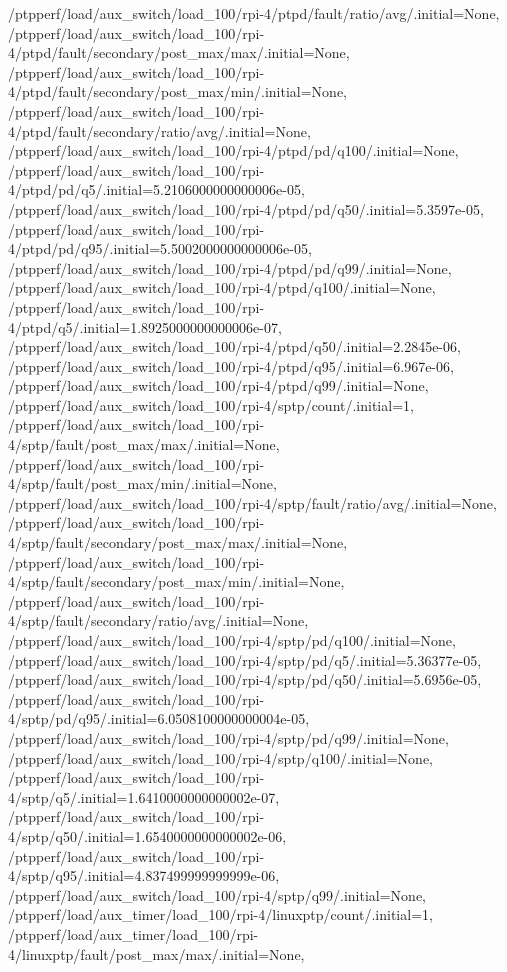 {    /ptpperf/load/aux_switch/load_100/rpi-4/ptpd/fault/ratio/avg/.initial=None,
    /ptpperf/load/aux_switch/load_100/rpi-4/ptpd/fault/secondary/post_max/max/.initial=None,
    /ptpperf/load/aux_switch/load_100/rpi-4/ptpd/fault/secondary/post_max/min/.initial=None,
    /ptpperf/load/aux_switch/load_100/rpi-4/ptpd/fault/secondary/ratio/avg/.initial=None,
    /ptpperf/load/aux_switch/load_100/rpi-4/ptpd/pd/q100/.initial=None,
    /ptpperf/load/aux_switch/load_100/rpi-4/ptpd/pd/q5/.initial=5.2106000000000006e-05,
    /ptpperf/load/aux_switch/load_100/rpi-4/ptpd/pd/q50/.initial=5.3597e-05,
    /ptpperf/load/aux_switch/load_100/rpi-4/ptpd/pd/q95/.initial=5.5002000000000006e-05,
    /ptpperf/load/aux_switch/load_100/rpi-4/ptpd/pd/q99/.initial=None,
    /ptpperf/load/aux_switch/load_100/rpi-4/ptpd/q100/.initial=None,
    /ptpperf/load/aux_switch/load_100/rpi-4/ptpd/q5/.initial=1.8925000000000006e-07,
    /ptpperf/load/aux_switch/load_100/rpi-4/ptpd/q50/.initial=2.2845e-06,
    /ptpperf/load/aux_switch/load_100/rpi-4/ptpd/q95/.initial=6.967e-06,
    /ptpperf/load/aux_switch/load_100/rpi-4/ptpd/q99/.initial=None,
    /ptpperf/load/aux_switch/load_100/rpi-4/sptp/count/.initial=1,
    /ptpperf/load/aux_switch/load_100/rpi-4/sptp/fault/post_max/max/.initial=None,
    /ptpperf/load/aux_switch/load_100/rpi-4/sptp/fault/post_max/min/.initial=None,
    /ptpperf/load/aux_switch/load_100/rpi-4/sptp/fault/ratio/avg/.initial=None,
    /ptpperf/load/aux_switch/load_100/rpi-4/sptp/fault/secondary/post_max/max/.initial=None,
    /ptpperf/load/aux_switch/load_100/rpi-4/sptp/fault/secondary/post_max/min/.initial=None,
    /ptpperf/load/aux_switch/load_100/rpi-4/sptp/fault/secondary/ratio/avg/.initial=None,
    /ptpperf/load/aux_switch/load_100/rpi-4/sptp/pd/q100/.initial=None,
    /ptpperf/load/aux_switch/load_100/rpi-4/sptp/pd/q5/.initial=5.36377e-05,
    /ptpperf/load/aux_switch/load_100/rpi-4/sptp/pd/q50/.initial=5.6956e-05,
    /ptpperf/load/aux_switch/load_100/rpi-4/sptp/pd/q95/.initial=6.0508100000000004e-05,
    /ptpperf/load/aux_switch/load_100/rpi-4/sptp/pd/q99/.initial=None,
    /ptpperf/load/aux_switch/load_100/rpi-4/sptp/q100/.initial=None,
    /ptpperf/load/aux_switch/load_100/rpi-4/sptp/q5/.initial=1.6410000000000002e-07,
    /ptpperf/load/aux_switch/load_100/rpi-4/sptp/q50/.initial=1.6540000000000002e-06,
    /ptpperf/load/aux_switch/load_100/rpi-4/sptp/q95/.initial=4.837499999999999e-06,
    /ptpperf/load/aux_switch/load_100/rpi-4/sptp/q99/.initial=None,
    /ptpperf/load/aux_timer/load_100/rpi-4/linuxptp/count/.initial=1,
    /ptpperf/load/aux_timer/load_100/rpi-4/linuxptp/fault/post_max/max/.initial=None,
}
